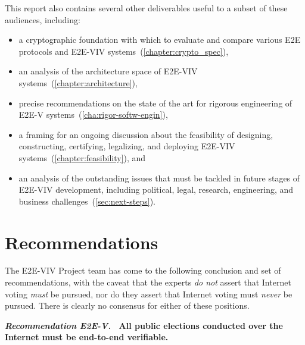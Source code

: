 This report also contains several other deliverables useful to a
subset of these audiences, including:
\begin{itemize}
\item a cryptographic foundation with which to evaluate and compare
  various E2E protocols and E2E-VIV
  systems~(\autoref{chapter:crypto_spec}),
\item an analysis of the architecture space of E2E-VIV
  systems~(\autoref{chapter:architecture}),
\item precise recommendations on the state of the art for rigorous
  engineering of E2E-V systems~(\autoref{cha:rigor-softw-engin}),
\item a framing for an ongoing discussion about the feasibility of
  designing, constructing, certifying, legalizing, and deploying
  E2E-VIV systems~(\autoref{chapter:feasibility}), and
\item an analysis of the outstanding issues that must be tackled in
  future stages of E2E-VIV development, including political, legal,
  research, engineering, and business
  challenges~(\autoref{sec:next-steps}).
\end{itemize}

\section{Recommendations}

The E2E-VIV Project team has come to the following conclusion and set
of recommendations, with the caveat that the experts \emph{do not}
assert that Internet voting \emph{must} be pursued, nor do they assert
that Internet voting must \emph{never} be pursued. There is clearly no
consensus for either of these positions.

\vspace{12pt} 
\textbf{\emph{Recommendation E2E-V.} \ All public elections conducted
  over the Internet must be end-to-end verifiable.} 

